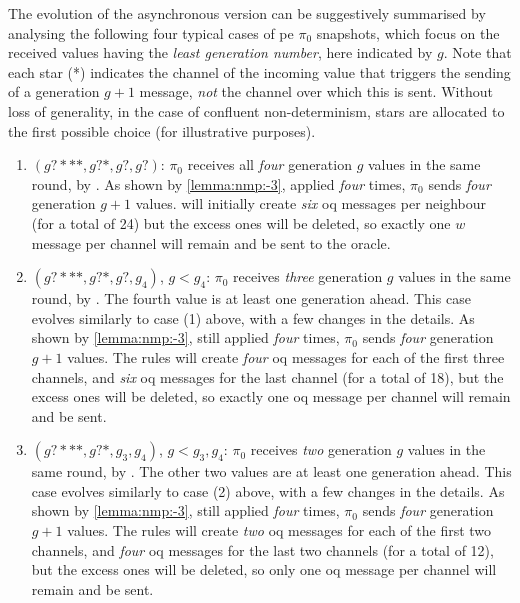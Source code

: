 \begin{remark}\label{remark:nmp:-2}
    The evolution of the asynchronous version can be suggestively summarised by
    analysing the following four typical cases of \gls{pe} $\pi_0$ snapshots,
    which focus on the received values having the \emph{least generation number}, here indicated by $g$.
    Note that each star (*) indicates the channel of the incoming value 
    that triggers the sending of a generation $g+1$ message, 
    \emph{not} the channel over which this is sent.
    Without loss of generality, in the case of confluent non-determinism,
    stars are allocated to the first possible choice (for illustrative purposes).
    
    \begin{enumerate}
    \item $(g?***, g?*, g?, g?)$: 
    $\pi_0$ receives all \emph{four} generation $g$ values in the same round, by . 
    As shown by \cref{lemma:nmp:-3}, applied \emph{four} times, 
    $\pi_0$ sends \emph{four} generation $g+1$ values.
     will initially create \emph{six} \gls{oq} messages per neighbour (for a total of 24)
    but the excess ones will be deleted, so exactly one \(w\) message per channel will remain and be sent to the oracle.
    
    \medskip
    \item $(g?***, g?*, g?, g_4)$, $g < g_4$: 
    $\pi_0$ receives \emph{three} generation $g$ values in the same round, by .
    The fourth value is at least one generation ahead.    
    This case evolves similarly to case (1) above, with a few changes in the details.
    As shown by \cref{lemma:nmp:-3}, still applied \emph{four} times, 
    $\pi_0$ sends \emph{four} generation $g+1$ values.
    The rules will create \emph{four} \gls{oq} messages for each of the first three channels,
    and \emph{six} \gls{oq} messages for the last channel (for a total of 18),
    but the excess ones will be deleted, so exactly one \gls{oq} message per channel will remain and be sent.
    
    \medskip
    \item $(g?***, g?*, g_3, g_4)$, $g < g_3, g_4$: 
    $\pi_0$ receives \emph{two} generation $g$ values in the same round, by .
    The other two values are at least one generation ahead.    
    This case evolves similarly to case (2) above, with a few changes in the details.
    As shown by \cref{lemma:nmp:-3}, still applied \emph{four} times, 
    $\pi_0$ sends \emph{four} generation $g+1$ values.
    The rules will create \emph{two} \gls{oq} messages for each of the first two channels,
    and \emph{four} \gls{oq} messages for the last two channels (for a total of 12),
    but the excess ones will be deleted, so only one \gls{oq} message per channel will remain and be sent.
    

\end{enumerate}
\end{remark}
